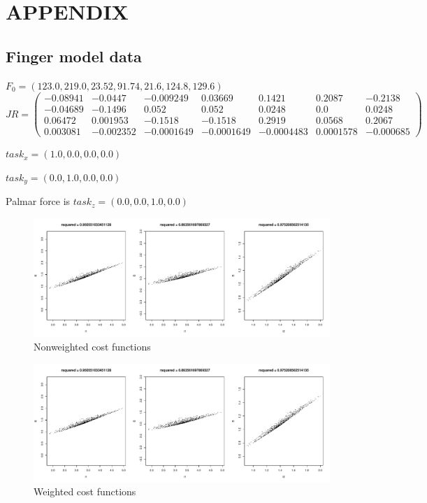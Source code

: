 \section{APPENDIX}

\subsection{Finger model data}
$F_0 = (123.0, 219.0, 23.52, 91.74,	21.6, 124.8, 129.6)$\\
$
JR = 
\begin{pmatrix}
-0.08941 & -0.0447 & -0.009249 & 0.03669 & 0.1421 & 0.2087 & -0.2138 \\
-0.04689 & -0.1496 & 0.052 &0.052 & 0.0248 & 0.0 & 0.0248 \\ 
0.06472 & 0.001953 & -0.1518 &-0.1518 & 0.2919 & 0.0568 & 0.2067 \\
0.003081 & -0.002352 & -0.0001649 & -0.0001649 & -0.0004483 & 0.0001578 & -0.000685
\end{pmatrix}$

$task_x = (1.0,0.0,0.0,0.0)$

$task_y = (0.0,1.0,0.0,0.0)$

Palmar force is $task_z = (0.0,0.0,1.0,0.0)$


\begin{figure}[h]
\centering
\includegraphics[width=\textwidth,page=1]{figs/cost_function_scatterplots.pdf}
\caption{Nonweighted cost functions}
\label{fig:unweighted_cost_functions}
\end{figure}

\begin{figure}[h]
\centering
\includegraphics[width=\textwidth,page=2]{figs/cost_function_scatterplots.pdf}
\caption{Weighted cost functions}
\label{fig:weighted_cost_functions}
\end{figure}
